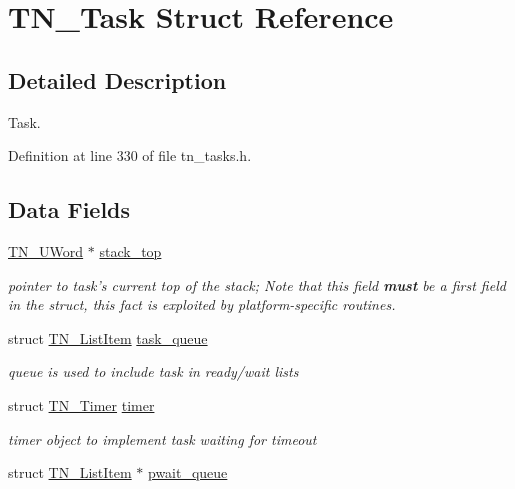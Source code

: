 \hypertarget{structTN__Task}{\section{T\+N\+\_\+\+Task Struct Reference}
\label{structTN__Task}
}


\subsection{Detailed Description}
Task. 

Definition at line 330 of file tn\+\_\+tasks.\+h.

\subsection*{Data Fields}
\begin{DoxyCompactItemize}
\item 
\hyperlink{tn__arch__example_8h_ab80cba0fe9ffcd9011d53dfeb9e39bf4}{T\+N\+\_\+\+U\+Word} $\ast$ \hyperlink{structTN__Task_a6e31948663b2846ac9dddc05f529286a}{stack\+\_\+top}
\begin{DoxyCompactList}\small\item\em pointer to task's current top of the stack; Note that this field {\bfseries must} be a first field in the struct, this fact is exploited by platform-\/specific routines. \end{DoxyCompactList}\item 
\hypertarget{structTN__Task_a0772dfcd1f95d0ba10b9d2820fb9201b}{struct \hyperlink{structTN__ListItem}{T\+N\+\_\+\+List\+Item} \hyperlink{structTN__Task_a0772dfcd1f95d0ba10b9d2820fb9201b}{task\+\_\+queue}}\label{structTN__Task_a0772dfcd1f95d0ba10b9d2820fb9201b}

\begin{DoxyCompactList}\small\item\em queue is used to include task in ready/wait lists \end{DoxyCompactList}\item 
\hypertarget{structTN__Task_ac394d7ba177bab077969e9d96cddd8fb}{struct \hyperlink{structTN__Timer}{T\+N\+\_\+\+Timer} \hyperlink{structTN__Task_ac394d7ba177bab077969e9d96cddd8fb}{timer}}\label{structTN__Task_ac394d7ba177bab077969e9d96cddd8fb}

\begin{DoxyCompactList}\small\item\em timer object to implement task waiting for timeout \end{DoxyCompactList}\item 
\hypertarget{structTN__Task_a971ab5689af53bed2548c62f3bcabdc5}{struct \hyperlink{structTN__ListItem}{T\+N\+\_\+\+List\+Item} $\ast$ \hyperlink{structTN__Task_a971ab5689af53bed2548c62f3bcabdc5}{pwait\+\_\+queue}}\label{structTN__Task_a971ab5689af53bed2548c62f3bcabdc5}


\end{DoxyCompactItemize}
